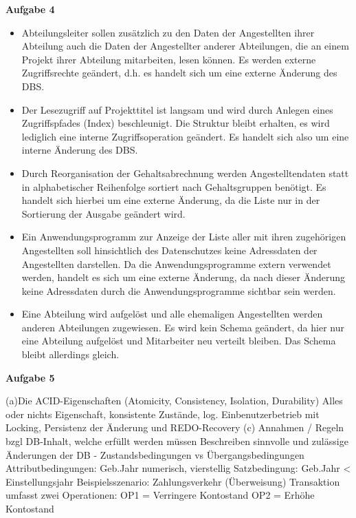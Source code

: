 \documentclass[a4paper,12pt]{article}
\newcommand{\Aufgabe}[1]{
        {
        \vspace*{0.5cm}
        \textbf{Aufgabe #1}
        \vspace*{0.2cm}
    }
}
\begin{document}
    \newpage

    \Aufgabe{4}
    \begin{itemize}
        \item Abteilungsleiter sollen zusätzlich zu den Daten der Angestellten ihrer Abteilung auch die Daten der
        Angestellter anderer Abteilungen, die an einem Projekt ihrer Abteilung mitarbeiten, lesen können.
        \newline Es werden externe Zugriffsrechte geändert, d.h. es handelt sich um eine externe Änderung des DBS.
        \item Der Lesezugriff auf Projekttitel ist langsam und wird durch Anlegen eines Zugriffspfades (Index)
        beschleunigt.
        \newline Die Struktur bleibt erhalten, es wird lediglich eine interne Zugriffsoperation geändert.
        Es handelt sich also um eine interne Änderung des DBS.
        \item Durch Reorganisation der Gehaltsabrechnung werden Angestelltendaten statt in alphabetischer Reihenfolge
        sortiert nach Gehaltsgruppen benötigt.
        \newline Es handelt sich hierbei um eine externe Änderung, da die Liste nur in der Sortierung der Ausgabe geändert wird.
        \item Ein Anwendungsprogramm zur Anzeige der Liste aller mit ihren zugehörigen Angestellten soll hinsichtlich
        des Datenschutzes keine Adressdaten der Angestellten darstellen.
        \newline Da die Anwendungsprogramme extern verwendet werden, handelt es sich um eine externe Änderung, da
        nach dieser Änderung keine Adressdaten durch die Anwendungsprogramme sichtbar sein werden. %
        \item Eine Abteilung wird aufgelöst und alle ehemaligen Angestellten werden anderen Abteilungen zugewiesen.
        \newline Es wird kein Schema geändert, da hier nur eine Abteilung aufgelöst und Mitarbeiter neu verteilt bleiben.
        Das Schema bleibt allerdings gleich.
        \end{itemize}

    \newpage

    \Aufgabe{5}
    \newline (a)Die ACID-Eigenschaften (Atomicity, Consistency, Isolation, Durability)
    Alles oder nichts Eigenschaft, konsistente Zustände, log. Einbenutzerbetrieb mit Locking,
    Persistenz der Änderung und REDO-Recovery
    \newline (c) Annahmen / Regeln bzgl DB-Inhalt, welche erfüllt werden müssen
    Beschreiben sinnvolle und zulässige Änderungen der DB
    - Zustandsbedingungen vs Übergangsbedingungen
    Attributbedingungen: Geb.Jahr numerisch, vierstellig
    Satzbedingung: Geb.Jahr < Einstellungsjahr
    \newline Beispielsszenario: Zahlungsverkehr (Überweisung)
    Transaktion umfasst zwei Operationen:
    OP1 = Verringere Kontostand
    OP2 = Erhöhe Kontostand
\end{document}
